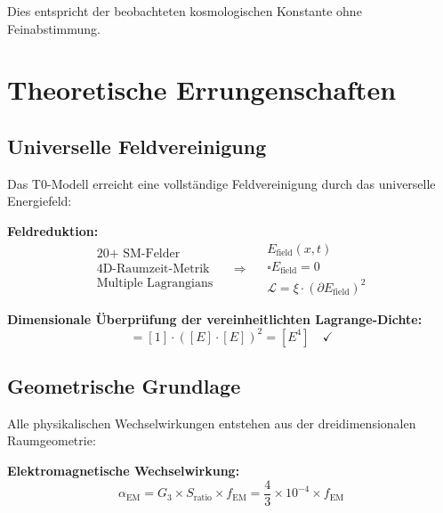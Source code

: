 \documentclass[12pt,a4paper]{report}
\begin{document}
	Dies entspricht der beobachteten kosmologischen Konstante ohne Feinabstimmung.
	
	\section{Theoretische Errungenschaften}
	\label{sec:theoretical_achievements}
	
	\subsection{Universelle Feldvereinigung}
	\label{subsec:universal_field_unification}
	
	Das T0-Modell erreicht eine vollständige Feldvereinigung durch das universelle Energiefeld:
	
	\textbf{Feldreduktion:}
	\begin{equation}
		\begin{array}{c}
			\text{20+ SM-Felder} \\
			\text{4D-Raumzeit-Metrik} \\
			\text{Multiple Lagrangians}
		\end{array} \quad \Rightarrow \quad
		\begin{array}{c}
			E_{\text{field}}(x,t) \\
			\square E_{\text{field}} = 0 \\
			\mathcal{L} = \xi \cdot (\partial E_{\text{field}})^2
		\end{array}
	\end{equation}
	
	\textbf{Dimensionale Überprüfung der vereinheitlichten Lagrange-Dichte:}
	\begin{equation}
		[\mathcal{L}] = [1] \cdot ([E] \cdot [E])^2 = [E^4] \quad \checkmark
	\end{equation}
	
	\subsection{Geometrische Grundlage}
	\label{subsec:geometric_foundation}
	
	Alle physikalischen Wechselwirkungen entstehen aus der dreidimensionalen Raumgeometrie:
	
	\textbf{Elektromagnetische Wechselwirkung:}
	\begin{equation}
		\alpha_{\text{EM}} = G_3 \times S_{\text{ratio}} \times f_{\text{EM}} = \frac{4}{3} \times 10^{-4} \times f_{\text{EM}}
	\end{equation}
	
\end{document}
